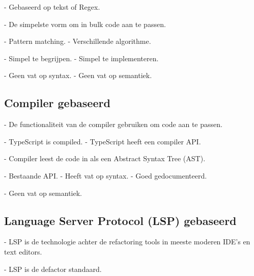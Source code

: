 
- Gebaseerd op tekst of Regex.


- De simpelste vorm om in bulk code aan te passen.


- Pattern matching.
- Verschillende algorithme.


- Simpel te begrijpen.
- Simpel te implementeren.


- Geen vat op syntax.
- Geen vat op semantiek.

\subsection{Compiler gebaseerd}
\label{ch:stand-van-zaken:refactoring:compiler}


- De functionaliteit van de compiler gebruiken om code aan te passen.


- TypeScript is compiled.
- TypeScript heeft een compiler API.


- Compiler leest de code in als een Abstract Syntax Tree (AST).


- Bestaande API.
- Heeft vat op syntax.
- Goed gedocumenteerd.


- Geen vat op semantiek.

\subsection{Language Server Protocol (LSP) gebaseerd}
\label{ch:stand-van-zaken:refactoring:lsp}


- LSP is de technologie achter de refactoring tools in meeste moderen IDE's en text editors.


- LSP is de defactor standaard.


